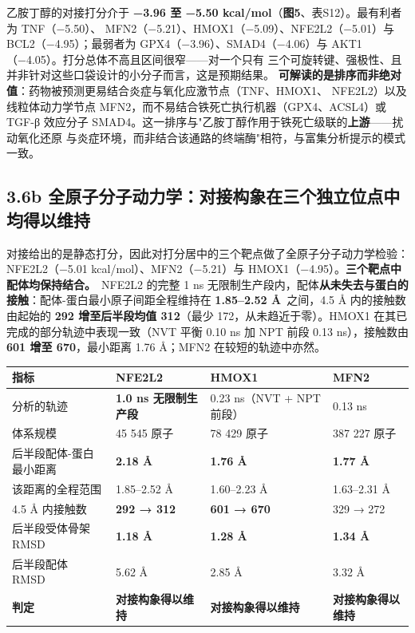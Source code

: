 \documentclass[UTF8,fontset=windows,11pt]{ctexart}
\begin{document}
乙胺丁醇的对接打分介于 \textbf{−3.96 至 −5.50 kcal/mol}（\textbf{图5}、表S12）。最有利者为 TNF（−5.50）、 MFN2（−5.21）、HMOX1（−5.09）、NFE2L2（−5.01）与 BCL2（−4.95）；最弱者为 GPX4（−3.96）、SMAD4（−4.06）与 AKT1（−4.05）。打分总体不高且区间很窄——对一个只有 三个可旋转键、强极性、且并非针对这些口袋设计的小分子而言，这是预期结果。 \textbf{可解读的是排序而非绝对值}：药物被预测更易结合炎症与氧化应激节点（TNF、HMOX1、 NFE2L2）以及线粒体动力学节点 MFN2，而不易结合铁死亡执行机器（GPX4、ACSL4）或 TGF-β 效应分子 SMAD4。这一排序与"乙胺丁醇作用于铁死亡级联的\textbf{上游}——扰动氧化还原 与炎症环境，而非结合该通路的终端酶"相符，与富集分析提示的模式一致。

\subsection{3.6b 全原子分子动力学：对接构象在三个独立位点中均得以维持}

对接给出的是静态打分，因此对打分居中的三个靶点做了全原子分子动力学检验：NFE2L2（−5.01 kcal/mol）、MFN2（−5.21）与 HMOX1（−4.95）。\textbf{三个靶点中配体均保持结合。}\ NFE2L2 的完整 1 ns 无限制生产段内，配体\textbf{从未失去与蛋白的接触}：配体-蛋白最小原子间距全程维持在 \textbf{1.85–2.52 Å}\ 之间，4.5 Å 内的接触数由起始的 \textbf{292 增至后半段均值 312}（最少 172，从未趋近于零）。HMOX1 在其已完成的部分轨迹中表现一致（NVT 平衡 0.10 ns 加 NPT 前段 0.13 ns），接触数由 \textbf{601 增至 670}，最小距离 1.76 Å；MFN2 在较短的轨迹中亦然。

\begin{center}
\small
\begin{longtable}{p{}p{}p{}p{}}
\hline
指标 & NFE2L2 & HMOX1 & MFN2 \\
\hline
分析的轨迹 & \textbf{1.0 ns 无限制生产段} & 0.23 ns（NVT + NPT 前段） & 0.13 ns \\
体系规模 & 45 545 原子 & 78 429 原子 & 387 227 原子 \\
后半段配体-蛋白最小距离 & \textbf{2.18 Å} & \textbf{1.76 Å} & \textbf{1.77 Å} \\
该距离的全程范围 & 1.85–2.52 Å & 1.60–2.23 Å & 1.63–2.31 Å \\
4.5 Å 内接触数 & \textbf{292 → 312} & \textbf{601 → 670} & 329 → 272 \\
后半段受体骨架 RMSD & \textbf{1.18 Å} & \textbf{1.28 Å} & \textbf{1.34 Å} \\
后半段配体 RMSD & 5.62 Å & 2.85 Å & 3.32 Å \\
\textbf{判定} & \textbf{对接构象得以维持} & \textbf{对接构象得以维持} & \textbf{对接构象得以维持} \\
\hline
\end{longtable}
\end{center}
\end{document}
